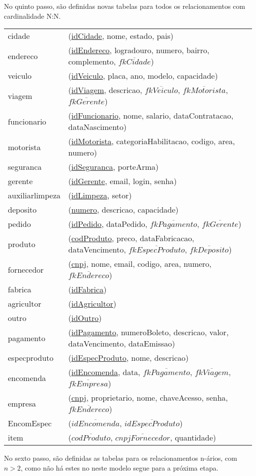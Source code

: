 \documentclass[12pt, onecolumn, titlepage]{article}
\begin{document}
No quinto passo, são definidas novas tabelas para todos os relacionamentos com cardinalidade N:N.

\begin{table}[htb!]
\begin{center}
\begin{tabular}{p{2.5cm} p{10.5cm}}
cidade & (\underline{idCidade}, nome, estado, pais) \\
endereco & (\underline{idEndereco}, logradouro, numero, bairro, complemento, $\overline{fkCidade}$) \\
veiculo & (\underline{idVeiculo}, placa, ano, modelo, capacidade) \\
viagem & (\underline{idViagem}, descricao, $\overline{fkVeiculo}$, $\overline{fkMotorista}$, $\overline{fkGerente}$) \\
funcionario & (\underline{idFuncionario}, nome, salario, dataContratacao, dataNascimento)\\
motorista & (\underline{idMotorista}, categoriaHabilitacao, codigo, area, numero)\\
seguranca & (\underline{idSeguranca}, porteArma)\\
gerente & (\underline{idGerente}, email, login, senha)\\
auxiliarlimpeza & (\underline{idLimpeza}, setor)\\
deposito & (\underline{numero}, descricao, capacidade)\\
pedido & (\underline{idPedido}, dataPedido, $\overline{fkPagamento}$, $\overline{fkGerente}$)\\
produto & (\underline{codProduto}, preco, dataFabricacao, dataVencimento, $\overline{fkEspecProduto}$, $\overline{fkDeposito}$)\\
fornecedor & (\underline{cnpj}, nome, email, codigo, area, numero, $\overline{fkEndereco}$)\\
fabrica & (\underline{idFabrica})\\
agricultor & (\underline{idAgricultor})\\
outro & (\underline{idOutro})\\
pagamento & (\underline{idPagamento}, numeroBoleto, descricao, valor, dataVencimento, dataEmissao)\\
especproduto & (\underline{idEspecProduto}, nome, descricao)\\
encomenda & (\underline{idEncomenda}, data, $\overline{fkPagamento}$, $\overline{fkViagem}$, $\overline{fkEmpresa}$)\\
empresa & (\underline{cnpj}, proprietario, nome, chaveAcesso, senha, $\overline{fkEndereco}$)\\
EncomEspec & (\underline{$\overline{idEncomenda}$}, \underline{$\overline{idEspecProduto}$})\\
item & (\underline{$\overline{codProduto}$}, \underline{$\overline{cnpjFornecedor}$}, quantidade)
\end{tabular}
\end{center}
\end{table}
\newpage
No sexto passo, são definidas as tabelas para os relacionamentos n-ários, com $n > 2$, como não há estes no neste modelo segue para a próxima etapa.
\end{document}
